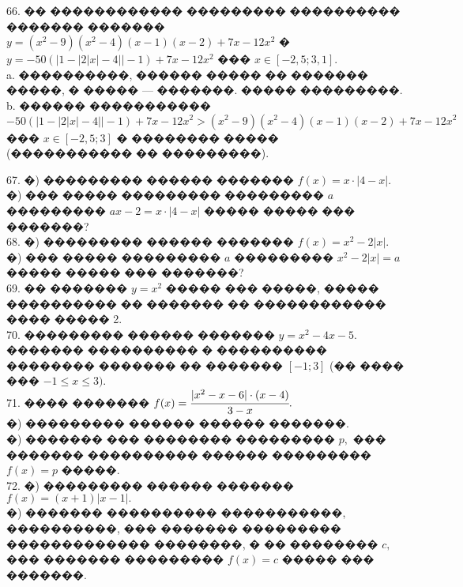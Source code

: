 \documentclass[12pt]{article}
\begin{document}
66. �� ������������ ��������� ���������� ������� ������� $y=(x^2-9)(x^2-4)(x-1)(x-2)+7x-12x^2$ � $y=-50(|1-|2|x|-4||-1)+7x-12x^2$ ���
$x\in[-2,5;3,1].$\\
a. ����������, ������ ����� �� ������� �����, � ����� --- �������. ����� ���������.\\
b. ������ �����������  $-50(|1-|2|x|-4||-1)+7x-12x^2 >(x^2-9)(x^2-4)(x-1)(x-2)+7x-12x^2$ ���
$x\in[-2,5;3]$ � �������� ����� (����������� �� ���������).
\begin{center}\end{center}
67. �) ��������� ������ ������� $f(x)=x\cdot|4-x|.$\\
�) ��� ����� ��������� ��������� $a$ ��������� $ax-2=x\cdot|4-x|$ ����� ����� ��� �������?\\
68. �) ��������� ������ ������� $f(x)=x^2-2|x|.$\\
�) ��� ����� ��������� $a$ ��������� $x^2-2|x|=a$ ����� ����� ��� �������?\\
69. �� ������� $y=x^2$ ����� ��� �����, ����� ���������� �� ������� �� ������������ ���� ����� 2.\\
70. ��������� ������ ������� $y=x^2-4x-5.$ ������� ���������� � ���������� �������� ������� �� ������� $[-1;3]$ (�� ���� ��� $-1\leqslant x \leqslant 3).$\\
71. ���� ������� $f(x)=\cfrac{|x^2-x-6|\cdot(x-4)}{3-x}.$\\
�) ��������� ������ ������ �������.\\
�) ������� ��� �������� ��������� $p,$ ��� ������� ���������� ������ ��������� $f(x)=p$ �����.\\
72. �) ��������� ������ ������� $f(x)=(x+1)|x-1|.$\\
�) ������� ���������� �����������, ����������, ��� ������� ��������� ������������� ��������, � �� �������� $c,$ ��� ������� ��������� $f(x)=c$ ����� ��� �������.\\
\end{document}
